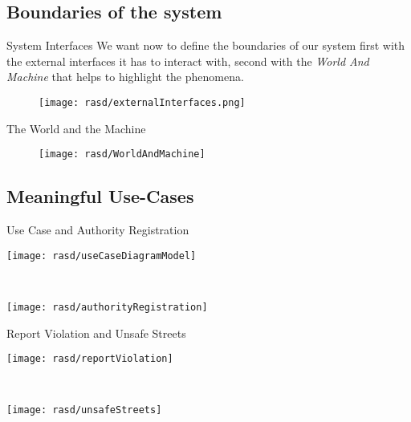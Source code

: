 	\subsection{Boundaries of the system}
		\begin{frame}{System Interfaces}
			\vspace{-10pt}
			We want now to define the boundaries of our system first with the external interfaces it has to interact with, second with the \emph{World And Machine} that helps to highlight the phenomena.
			
			\begin{figure}[h!]
				\centering
				\texttt{[image: rasd/externalInterfaces.png]}
			\end{figure}
		\end{frame}
		
		\begin{frame}{The World and the Machine}
			\vspace{-24pt}
			\begin{figure}[hbtp]
				\centering
				\texttt{[image: rasd/WorldAndMachine]}
			\end{figure}
		\end{frame}
	
	\subsection{Meaningful Use-Cases}
		\begin{frame}{Use Case and Authority Registration}
			\hspace*{-0.7cm}
			\begin{minipage}{0.4\textwidth}
				\centering
				\texttt{[image: rasd/useCaseDiagramModel]}
			\end{minipage}\hspace{1.9cm}
			~
			\begin{minipage}{0.4\textwidth}
				\centering
				\texttt{[image: rasd/authorityRegistration]}
			\end{minipage}
		\end{frame}
	
		\begin{frame}{Report Violation and Unsafe Streets}
			\hspace*{-0.4cm}
			\begin{minipage}{0.4\textwidth}
				\centering
				\texttt{[image: rasd/reportViolation]}
			\end{minipage}\hspace{1.2cm}
			~
			\begin{minipage}{0.4\textwidth}
				\centering
				\texttt{[image: rasd/unsafeStreets]}
			\end{minipage}
		\end{frame}
	

